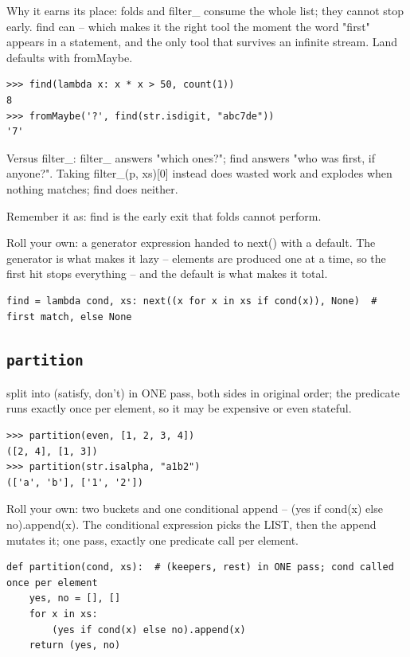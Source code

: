 \documentclass[10pt,letterpaper]{book}
\begin{document}
Why it earns its place: folds and filter\_ consume the whole list; they cannot stop early. find can -- which makes it the right tool the moment the word "first" appears in a statement, and the only tool that survives an infinite stream. Land defaults with fromMaybe.

\begin{lstlisting}[style=ex]
>>> find(lambda x: x * x > 50, count(1))
8
>>> fromMaybe('?', find(str.isdigit, "abc7de"))
'7'
\end{lstlisting}

Versus filter\_: filter\_ answers "which ones?"; find answers "who was first, if anyone?". Taking filter\_(p, xs)[0] instead does wasted work and explodes when nothing matches; find does neither.


Remember it as: find is the early exit that folds cannot perform.


Roll your own: a generator expression handed to next() with a default. The generator is what makes it lazy -- elements are produced one at a time, so the first hit stops everything -- and the default is what makes it total.

\begin{lstlisting}[style=ex]
find = lambda cond, xs: next((x for x in xs if cond(x)), None)  # first match, else None
\end{lstlisting}

\subsection{\texttt{partition}}\label{def:partition}
split into (satisfy, don't) in ONE pass, both sides in original order; the predicate runs exactly once per element, so it may be expensive or even stateful.
\begin{lstlisting}[style=ex]
>>> partition(even, [1, 2, 3, 4])
([2, 4], [1, 3])
>>> partition(str.isalpha, "a1b2")
(['a', 'b'], ['1', '2'])
\end{lstlisting}

Roll your own: two buckets and one conditional append -- (yes if cond(x) else no).append(x). The conditional expression picks the LIST, then the append mutates it; one pass, exactly one predicate call per element.

\begin{lstlisting}[style=ex]
def partition(cond, xs):  # (keepers, rest) in ONE pass; cond called once per element
    yes, no = [], []
    for x in xs:
        (yes if cond(x) else no).append(x)
    return (yes, no)
\end{lstlisting}
\end{document}
